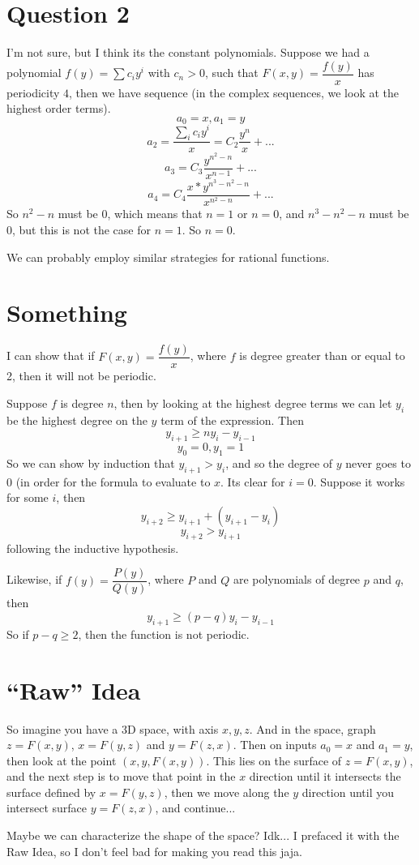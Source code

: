 \documentclass[12pt]{article}
\begin{document}
\section{Question 2}

I'm not sure, but I think its the constant polynomials. Suppose we had a polynomial $f(y) = \sum c_iy^i$ with $c_n > 0$, such that $F(x,y) = \dfrac{f(y)}{x}$ has periodicity $4$, then we have sequence (in the complex sequences, we look at the highest order terms).
\[ a_0 = x, a_1 = y \]
\[ a_2 = \dfrac{\sum_i c_i y^i}{x} = C_2\frac{y^n}{x} + ... \]
\[ a_3 = C_3 \frac{y^{n^2-n}}{x^{n-1}} + ...\]
\[ a_4 = C_4 \dfrac{x*y^{n^3-n^2-n}}{x^{n^2 - n}} + ...\]
So $n^2 - n$ must be 0, which means that $n = 1$ or $n=0$, and $n^3 - n^2 - n$ must be 0, but this is not the case for $n = 1$. So $n=0$. 

We can probably employ similar strategies for rational functions.

\section{Something}

I can show that if $F(x,y) = \dfrac{f(y)}{x}$, where $f$ is degree greater than or equal to 2, then it will not be periodic. 

Suppose $f$ is degree $n$, then by looking at the highest degree terms we can let $y_i$ be the highest degree on the $y$ term of the expression. Then
\[ y_{i+1} \geq ny_{i} - y_{i-1} \]
\[ y_0 = 0, y_1 = 1 \]
So we can show by induction that $y_{i+1} > y_i$, and so the degree of $y$ never goes to 0 (in order for the formula to evaluate to $x$. Its clear for $i = 0$. Suppose it works for some $i$, then 
\[ y_{i+2} \geq y_{i+1} + (y_{i+1} - y_{i}) \]
\[ y_{i+2} > y_{i+1} \]
following the inductive hypothesis.

Likewise, if $f(y) = \dfrac{P(y)}{Q(y)}$, where $P$ and $Q$ are polynomials of degree $p$ and $q$, then
\[ y_{i+1} \geq (p-q)y_{i} - y_{i-1} \]
So if $p - q \geq 2$, then the function is not periodic.

\section{``Raw'' Idea}

So imagine you have a 3D space, with axis $x,y,z$. And in the space, graph $z = F(x,y)$, $x = F(y,z)$ and $y = F(z,x)$. Then on inputs $a_0 = x$ and $a_1 = y$, then look at the point $(x,y, F(x,y))$. This lies on the surface of $z = F(x,y)$, and the next step is to move that point in the $x$ direction until it intersects the surface defined by $x = F(y,z)$, then we move along the $y$ direction until you intersect surface $y = F(z,x)$, and continue...

Maybe we can characterize the shape of the space? Idk... I prefaced it with the Raw Idea, so I don't feel bad for making you read this jaja. 
\end{document}
